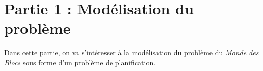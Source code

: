 
\section{Partie 1 : Modélisation du problème}

Dans cette partie, on va s'intéresser à la modélisation du problème du \textit{Monde des Blocs} sous forme d'un problème de planification.